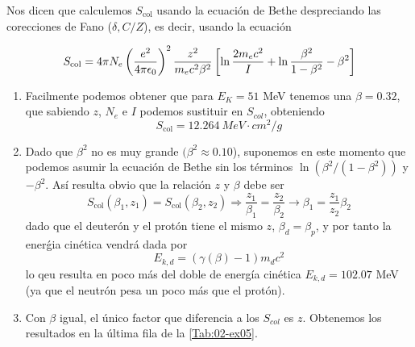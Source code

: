 Nos dicen que calculemos $S_{\text{col}}$ usando la ecuación de Bethe despreciando las corecciones de Fano ($\delta, C/Z$), es decir, usando la ecuación 

\begin{equation*}
S_\text{\text{col}} = 4\pi N_e \left( \frac{e^2}{4\pi \epsilon_0} \right)^2 
\frac{z^2}{m_e c^2 \beta^2} 
\left[ \ln \frac{2 m_e c^2}{I} + \ln \frac{\beta^2}{1 - \beta^2} - \beta^2  \right]
\end{equation*}

\begin{enumerate}
    \item Facilmente podemos obtener que para $E_K=51$ MeV tenemos una $\beta = 0.32$, que sabiendo $z$, $N_e$ e $I$ podemos sustituir en $S_{col}$, obteniendo 
    \[ S_{\text{col}} = 12.264 \ \unit{MeV \cdot cm^2 / g}\]
    \item Dado que $\beta^2$ no es muy grande $(\beta^2 \approx 0.10$), suponemos en este momento que podemos asumir la ecuación de Bethe sin los términos $\ln(\beta^2/(1-\beta^2))$ y $-\beta^2$. Así resulta obvio que la relación $z$ y $\beta$ debe ser
    \begin{equation*}
        S_{\text{col}} (\beta_1,z_1) = S_{\text{col}} (\beta_2,z_2) \Rightarrow \frac{z_1}{\beta_1} = \frac{z_2}{\beta_2} \to \beta_1 = \frac{z_1}{z_2} \beta_2
    \end{equation*}
    dado que el deuterón y el protón tiene el mismo $z$, $\beta_d = \beta_p$, y por tanto la enerǵia cinética vendrá dada por 
    \begin{equation*}
        E_{k,d} = (\gamma(\beta)-1) m_d c^2
    \end{equation*}
    lo qeu resulta en poco más del doble de energía cinética $E_{k,d} = 102.07$ MeV (ya que el neutrón pesa un poco más que el protón). 
    \item Con $\beta$ igual, el único factor que diferencia a los $S_{col}$ es $z$. Obtenemos los resultados en la última fila de la \cref{Tab:02-ex05}.
\end{enumerate}




